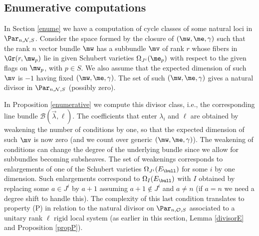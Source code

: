 \subsection{Enumerative computations}\label{concept}
In Section \ref{enume} we have a computation of cycle classes of some natural loci in $\Par_{n,\mathcal{N},S}$.  Consider  the space formed by  the closure of $(\mw,\me,\gamma)$ such that the rank $n$ vector bundle $\mw$ has a subbundle $\mv$ of rank $r$ whose fibers in $\Gr(r,\mw_p)$ lie in given Schubert varieties $\Omega_{J^i}(\me_p)$ with respect to the given flags on $\mw_p$, with $p\in S$. We also assume that the expected dimension of such $\mv$ is $-1$ having fixed $(\mw,\me,\gamma)$. The set of  such $(\mw,\me,\gamma)$ gives  a natural divisor in $\Par_{n,\mathcal{N},S}$ (possibly zero).

In Proposition \ref{enumerative} we compute this divisor class, i.e., the corresponding line bundle $\mathcal{B}(\vec{\lambda},\ell)$. The coefficients that enter $\lambda_i$ and $\ell$ are obtained by weakening the number of conditions by one, so that the expected dimension of such $\mv$ is now zero (and we count over generic $(\mw,\me,\gamma)$). The weakening of conditions can change the degree of the underlying bundle since we allow for subbundles becoming subsheaves. The set of weakenings corresponds to enlargements of one of the Schubert varieties $\Omega_{J^i}(E_{\bull})$  for some $i$ by one dimension. Such enlargements correspond to $\Omega_{I}(E_{\bull})$ with $I$ obtained by replacing some $a\in J^i$ by $a+1$ assuming $a+1\notin J^i$ and $a\neq n$ (if $a=n$ we need a degree shift to handle this). The complexity of this last condition translates to property (P) in relation to the natural divisor on $\Par_{n,\mathcal{O},S}$ associated to a unitary rank $\ell$ rigid local system (as earlier in this section, Lemma \ref{divisorE} and Proposition \ref{propP}).

